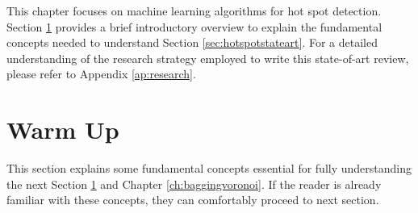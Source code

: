 This chapter focuses on machine learning algorithms for hot spot detection. Section \ref{sec:introperritardati} provides a brief introductory overview to explain the fundamental concepts needed to understand Section \ref{sec:hotspotstateart}. For a detailed understanding of the research strategy employed to write this state-of-art review, please refer to Appendix \ref{ap:research}. 

\section{Warm Up}
\label{sec:introperritardati}
This section explains some fundamental concepts essential for fully understanding the next Section \ref{sec:introperritardati} and Chapter \ref{ch:baggingvoronoi}. If the reader is already familiar with these concepts, they can comfortably proceed to next section. 

